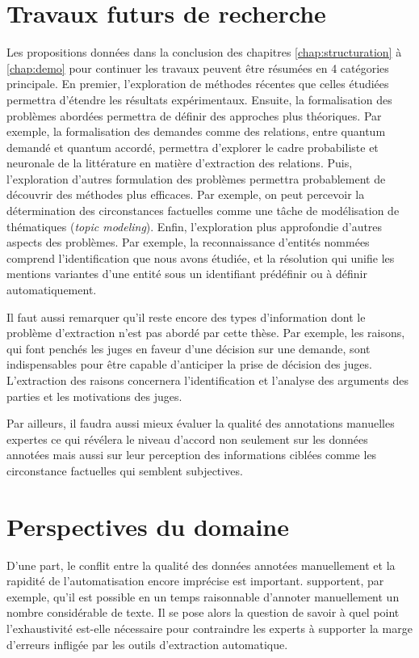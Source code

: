 \section{Travaux futurs de recherche}
\label{sec:conclusion:extensions}
Les propositions données dans la conclusion des chapitres \ref{chap:structuration} à \ref{chap:demo} pour continuer les travaux peuvent être résumées en 4 catégories principale. En premier, l'exploration de méthodes récentes que celles étudiées permettra d'étendre les résultats expérimentaux. Ensuite, la formalisation des problèmes abordées permettra de définir des approches plus théoriques. Par exemple, la formalisation des demandes comme des relations, entre quantum demandé et quantum accordé, permettra d'explorer le cadre probabiliste et neuronale de la littérature en matière d'extraction des relations. Puis, l'exploration d'autres formulation des problèmes permettra probablement de découvrir des méthodes plus efficaces. Par exemple, on peut percevoir la détermination des circonstances factuelles comme une tâche de modélisation de thématiques (\textit{topic modeling}). Enfin, l'exploration plus approfondie d'autres aspects des problèmes. Par exemple, la reconnaissance d'entités nommées comprend l'identification que nous avons étudiée, et la résolution qui unifie les mentions variantes d'une entité sous un identifiant prédéfinir ou à définir automatiquement.

Il faut aussi remarquer qu'il reste encore des types d'information dont le problème d'extraction n'est pas abordé par cette thèse. Par exemple, les raisons, qui  font penchés les juges en faveur d'une décision sur une demande, sont indispensables pour être capable d'anticiper la prise de décision des juges. L'extraction des raisons concernera l'identification et l'analyse des arguments des parties et les motivations des juges.

 Par ailleurs, il faudra aussi mieux évaluer la qualité des annotations manuelles expertes ce qui révélera le niveau d'accord non seulement sur les données annotées mais aussi sur leur perception des informations ciblées comme les circonstance factuelles qui semblent subjectives. 

\section{Perspectives du domaine}
\label{sec:conclusion:perspectives}

D'une part, le conflit entre la qualité des données annotées manuellement et la rapidité de l'automatisation encore imprécise est important. \cite{Galgani2015lexa} supportent, par exemple, qu'il est possible en un temps raisonnable d'annoter manuellement un nombre considérable de texte. Il se pose alors la question de savoir à quel point l'exhaustivité est-elle nécessaire pour contraindre les experts à supporter la marge d'erreurs infligée par les outils d'extraction automatique.

